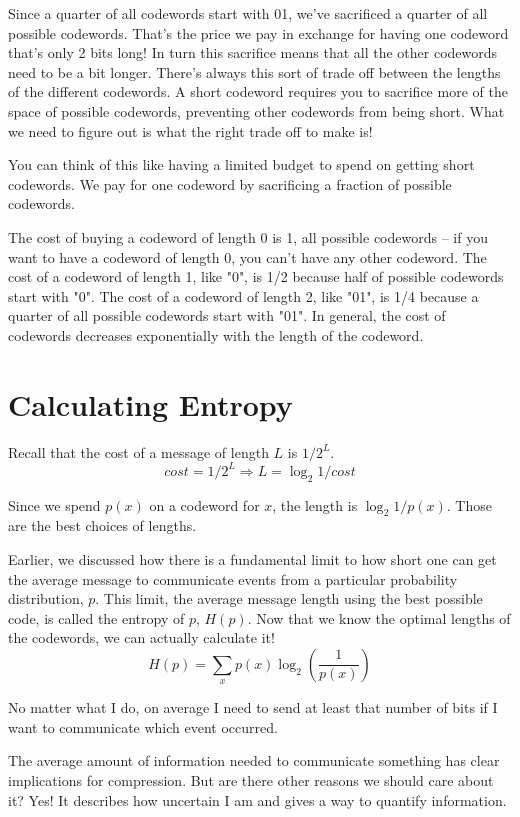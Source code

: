 Since a quarter of all codewords start with 01, we've sacrificed a quarter of all possible codewords.
That's the price we pay in exchange for having one codeword that's only 2 bits long!
In turn this sacrifice means that all the other codewords need to be a bit longer.
There's always this sort of trade off between the lengths of the different codewords.
A short codeword requires you to sacrifice more of the space of possible codewords, preventing other codewords from being short.
What we need to figure out is what the right trade off to make is!

You can think of this like having a limited budget to spend on getting short codewords.
We pay for one codeword by sacrificing a fraction of possible codewords.

The cost of buying a codeword of length 0 is 1, all possible codewords – if you want to have a codeword of length 0, you can't have any other codeword.
The cost of a codeword of length 1, like "0", is 1/2 because half of possible codewords start with "0".
The cost of a codeword of length 2, like "01", is 1/4 because a quarter of all possible codewords start with "01".
In general, the cost of codewords decreases exponentially with the length of the codeword.

\section{Calculating Entropy}
Recall that the cost of a message of length $L$ is $1/2^L$.
$$cost = 1/2^L \Rightarrow L = \log_2{1/cost}$$

Since we spend $p(x)$ on a codeword for $x$, the length is $\log_2{1/p(x)}$. Those are the best choices of lengths.

Earlier, we discussed how there is a fundamental limit to how short one can get the average message to communicate events
from a particular probability distribution, $p$.
This limit, the average message length using the best possible code, is called the entropy of $p$, $H(p)$.
Now that we know the optimal lengths of the codewords, we can actually calculate it!
$$H(p) = \sum_x p(x)\log_2\left(\frac{1}{p(x)}\right)$$

No matter what I do, on average I need to send at least that number of bits if I want to communicate which event occurred.

The average amount of information needed to communicate something has clear implications for compression.
But are there other reasons we should care about it? Yes! It describes how uncertain I am and gives a way to quantify information.

